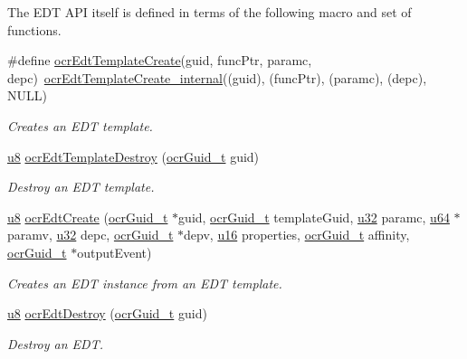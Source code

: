 The EDT API itself is defined in terms of the following macro and set of functions.
\begin{DoxyCompactItemize}
\item 
\#define \hyperlink{group__OCREDT_ga9649098ffad669c1c820cd821792d67a}
{ocr\-Edt\-Template\-Create}(guid, func\-Ptr, paramc, depc)~\hyperlink{group__OCREDT_gaa481a8e8f1a2af9aba623cb01b01bc1b}
{ocr\-Edt\-Template\-Create\-\_\-internal}((guid), (func\-Ptr), (paramc), (depc), N\-U\-L\-L)
\begin{DoxyCompactList}\small\item\em Creates an E\-D\-T template. \end{DoxyCompactList}

\item 
\hyperlink{group__OCRTypesGeneral_ga92c50087ca0e64fa93fc59402c55f8ca}{u8} \hyperlink{group__OCREDT_gace7063cfee522df47c64bf5013385c10}
{ocr\-Edt\-Template\-Destroy} (\hyperlink{group__OCRTypesGeneral_gacde3883d1ce245c051133c2c3aa82fc8}{ocr\-Guid\-\_\-t} guid)
\begin{DoxyCompactList}\small\item\em Destroy an E\-D\-T template. \end{DoxyCompactList}

\item 
\hyperlink{group__OCRTypesGeneral_ga92c50087ca0e64fa93fc59402c55f8ca}{u8} \hyperlink{group__OCREDT_gafa2443b31c38b4b7f9f59713abe12ecc}
{ocr\-Edt\-Create} (\hyperlink{group__OCRTypesGeneral_gacde3883d1ce245c051133c2c3aa82fc8}{ocr\-Guid\-\_\-t} $\ast$guid, \hyperlink{group__OCRTypesGeneral_gacde3883d1ce245c051133c2c3aa82fc8}{ocr\-Guid\-\_\-t} template\-Guid, \hyperlink{group__OCRTypesGeneral_gafaa62991928fb9fb18ff0db62a040aba}{u32} paramc, \hyperlink{group__OCRTypesGeneral_ga3f7e2bcbb0b4c338f3c4f6c937cd4234}{u64} $\ast$paramv, \hyperlink{group__OCRTypesGeneral_gafaa62991928fb9fb18ff0db62a040aba}{u32} depc, \hyperlink{group__OCRTypesGeneral_gacde3883d1ce245c051133c2c3aa82fc8}{ocr\-Guid\-\_\-t} $\ast$depv, \hyperlink{group__OCRTypesGeneral_gace9d960e74685e2cd84b36132dbbf8aa}{u16} properties, \hyperlink{group__OCRTypesGeneral_gacde3883d1ce245c051133c2c3aa82fc8}{ocr\-Guid\-\_\-t} affinity, \hyperlink{group__OCRTypesGeneral_gacde3883d1ce245c051133c2c3aa82fc8}{ocr\-Guid\-\_\-t} $\ast$output\-Event)
\begin{DoxyCompactList}\small\item\em Creates an E\-D\-T instance from an E\-D\-T template. \end{DoxyCompactList}

\item 
\hyperlink{group__OCRTypesGeneral_ga92c50087ca0e64fa93fc59402c55f8ca}{u8} \hyperlink{group__OCREDT_gae258a29af116794a73099e9c6d9232f8}
{ocr\-Edt\-Destroy} (\hyperlink{group__OCRTypesGeneral_gacde3883d1ce245c051133c2c3aa82fc8}{ocr\-Guid\-\_\-t} guid)
\begin{DoxyCompactList}\small\item\em Destroy an E\-D\-T. \end{DoxyCompactList}

\end{DoxyCompactItemize}


